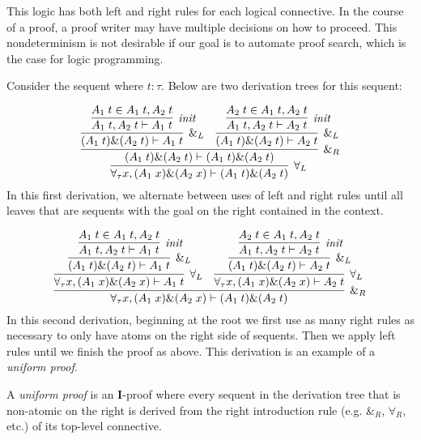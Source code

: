 This logic has both left and right rules for each logical connective. In the course of a proof, a proof writer may have multiple decisions on how to proceed. This nondeterminism is not desirable if our goal is to automate proof search, which is the case for logic programming.

\begin{expl}
\label{expl:hh}
Consider the sequent  where $t : \tau$. Below are two derivation trees for this sequent:

$$
\infer[\rl{$\forall_L$}]{\seq[\forall_\tau x , (A_1 \; x) \& (A_2 \; x)]{(A_1 \; t) \& (A_2 \; t)}}{
	\infer[\rl{$\&_R$}]{\seq[(A_1 \; t) \& (A_2 \; t)]{(A_1 \; t) \& (A_2 \; t)}}{
		\infer[\rl{$\&_L$}]{\seq[(A_1 \; t) \& (A_2 \; t)]{A_1 \; t}}{
			\infer[\rl{init}]{\seq[A_1 \; t , A_2 \; t]{A_1 \; t}}{A_1 \; t \in A_1 \; t , A_2 \; t}
		}
		&
		\infer[\rl{$\&_L$}]{\seq[(A_1 \; t) \& (A_2 \; t)]{A_2 \; t}}{
			\infer[\rl{init}]{\seq[A_1 \; t , A_2 \; t]{A_2 \; t}}{A_2 \; t \in A_1 \; t , A_2 \; t}
		}
	}
}
$$
In this first derivation, we alternate between uses of left and right rules until all leaves that are sequents with the goal on the right contained in the context.

$$
\infer[\rl{$\&_R$}]{\seq[\forall_\tau x , (A_1 \; x) \& (A_2 \; x)]{(A_1 \; t) \& (A_2 \; t)}}{
	\infer[\rl{$\forall_L$}]{\seq[\forall_\tau x , (A_1 \; x) \& (A_2 \; x)]{A_1 \; t}}{
		\infer[\rl{$\&_L$}]{\seq[(A_1 \; t) \& (A_2 \; t)]{A_1 \; t}}{
			\infer[\rl{init}]{\seq[A_1 \; t , A_2 \; t]{A_1 \; t}}{A_1 \; t \in A_1 \; t , A_2 \; t}
		}
	}
	&
	\infer[\rl{$\forall_L$}]{\seq[\forall_\tau x , (A_1 \; x) \& (A_2 \; x)]{A_2 \; t}}{
		\infer[\rl{$\&_L$}]{\seq[(A_1 \; t) \& (A_2 \; t)]{A_2 \; t}}{
			\infer[\rl{init}]{\seq[A_1 \; t , A_2 \; t]{A_2 \; t}}{A_2 \; t \in A_1 \; t , A_2 \; t}
		}
	}
}
$$
In this second derivation, beginning at the root we first use as many right rules as necessary to only have atoms on the right side of sequents. Then we apply left rules until we finish the proof as above. This derivation is an example of a \emph{uniform proof}.
\end{expl}

\begin{defnc}
A \emph{uniform proof} is an \textbf{I}-proof where every sequent in the derivation tree that is non-atomic on the right is derived from the right introduction rule (e.g. $\&_R$, $\forall_R$, etc.) of its top-level connective.
\end{defnc}


